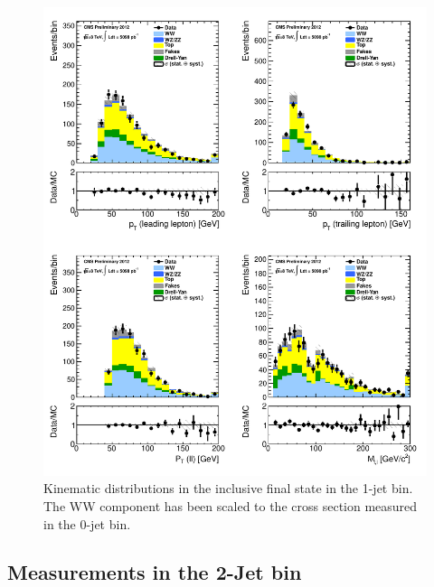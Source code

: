 \begin{figure}[!hbtp]
\centering
\includegraphics[width=1\textwidth]{figures/ww_analysis20_0_ALL_incl_1j.pdf} %
\caption{Kinematic distributions in the inclusive final state in the 1-jet bin.
The WW component has been scaled to the cross section measured in the 0-jet bin.}
\label{fig:xs_kinematics_incl_1j}
\end{figure}

\clearpage
\subsection{Measurements in the 2-Jet bin}

